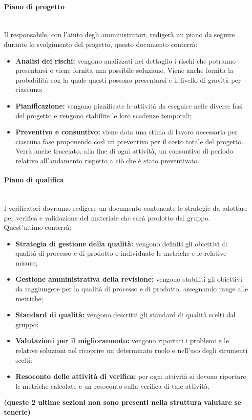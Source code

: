 \paragraph{Piano di progetto} \mbox{}\\
Il responsabile, con l'aiuto degli amministratori, redigerà un piano da seguire durante lo svolgimento del progetto, questo documento conterrà:
\begin{itemize}
	\item \textbf{Analisi dei rischi:} vengono analizzati nel dettaglio i rischi che potranno presentarsi e viene fornita una possibile soluzione. Viene anche fornita la probabilità con la quale questi possono presentarsi e il livello di gravità per ciascuno;
	\item \textbf{Pianificazione:} vengono pianificate le attività da eseguire nelle diverse fasi del progetto e vengono stabilite le loro scadenze temporali;
	\item \textbf{Preventivo e consuntivo:} viene data una stima di lavoro necessaria per ciascuna fase proponendo così un preventivo per il costo totale del progetto. Verrà anche tracciato, alla fine di ogni attività, un consuntivo di periodo relativo all'andamento rispetto a ciò che è stato preventivato.
\end{itemize}
\paragraph{Piano di qualifica} \mbox{}\\
I verificatori dovranno redigere un documento contenente le strategie da adottare per verifica e validazione del materiale che sarà prodotto dal gruppo. Quest'ultimo conterrà:
\begin{itemize}
	\item \textbf{Strategia di gestione della qualità:} vengono definiti gli obiettivi di qualità di processo e di prodotto e individuate le metriche e le relative misure;
	\item \textbf{Gestione amministrativa della revisione:} vengono stabiliti gli obiettivi da raggiungere per la qualità di processo e di prodotto, assegnando range alle metriche;
	\item \textbf{Standard di qualità:} vengono descritti gli standard di qualità scelti dal gruppo;
	\item \textbf{Valutazioni per il miglioramento:} vengono riportati i problemi e le relative soluzioni nel ricoprire un determinato ruolo e nell'uso degli strumenti scelti;
	\item \textbf{Resoconto delle attività di verifica:} per ogni attività si devono riportare le metriche calcolate e un resoconto sulla verifica di tale attività.
\end{itemize}
\textbf{(queste 2 ultime sezioni non sono presenti nella struttura valutare se tenerle)}

